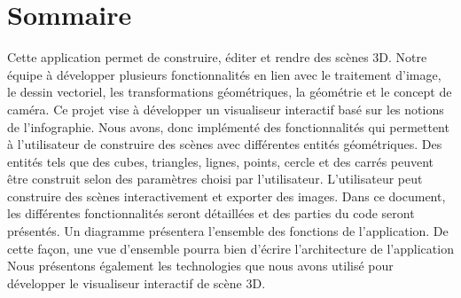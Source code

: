 \chapter{Sommaire}
\label{s:sommaire}

Cette application permet de construire, éditer et rendre des scènes 3D.  Notre équipe à développer plusieurs fonctionnalités en lien avec le traitement d’image, le dessin vectoriel, les transformations géométriques, la géométrie et le concept de caméra. 
Ce projet vise à développer un visualiseur interactif basé sur les notions de l’infographie. Nous avons, donc implémenté des fonctionnalités qui permettent à l’utilisateur de construire des scènes avec différentes entités géométriques.  Des entités tels que des cubes, triangles, lignes, points, cercle et des carrés peuvent être construit selon des paramètres choisi par l’utilisateur. 
L’utilisateur peut construire des scènes interactivement et exporter des images. 
Dans ce document, les différentes fonctionnalités seront détaillées et des parties du code seront présentés.  Un diagramme présentera l’ensemble des fonctions de l’application.  De cette façon, une vue d’ensemble pourra bien d’écrire l’architecture de l’application
Nous présentons également les technologies que nous avons utilisé pour développer le visualiseur interactif de scène 3D. 
 
